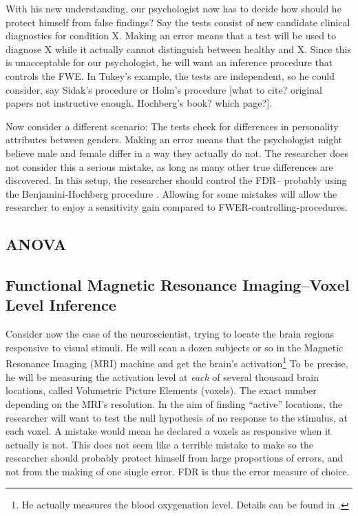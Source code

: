 \documentclass[draft,12pt]{article}
\begin{document}
With his new understanding, our psychologist now has to decide how should he protect himself from false findings? 
Say the tests consist of new candidate clinical diagnostics for condition X. Making an error means that a test will be used to diagnose X while it actually cannot distinguish between healthy and X. Since this is unacceptable for our psychologist, he will want an inference procedure that controls the FWE. In Tukey's example, the tests are independent, so he could consider, say Sidak's procedure or Holm's procedure [what to cite? original papers not instructive enough. Hochberg's book? which page?].


Now consider a different scenario: The tests check for differences in personality attributes between genders. Making an error means that the psychologist might believe male and female differ in a way they actually do not. The researcher does not consider this a serious mistake, as long as many other true differences are discovered. In this setup, the researcher should control the FDR-- probably using the Benjamini-Hochberg procedure \citep{benjamini_controlling_1995}. Allowing for some mistakes will allow the researcher to enjoy a sensitivity gain compared to FWER-controlling-procedures.


\subsection{ANOVA}



\subsection{\label{sub:fMRI}Functional Magnetic Resonance Imaging--Voxel Level Inference}
Consider now the case of the neuroscientist, trying to locate the brain regions responsive to visual stimuli. He will scan a dozen subjects or so in the Magnetic Resonance Imaging (MRI) machine and get the brain's activation\footnote{ He actually measures the blood oxygenation level. Details can be found in \cite{lazar_statistical_2008}.} To be precise, he will be measuring the activation level at \emph{each} of several thousand brain locations, called Volumetric Picture Elements (voxels). The exact number depending on the MRI's resolution. 
In the aim of finding ``active'' locations, the researcher will want to test the null hypothesis of no response to the stimulus, at each voxel. A mistake would mean he declared a voxels as responsive when it actually is not. This does not seem like a terrible mistake to make so the researcher should probably protect himself from large proportions of errors, and not from the making of one single error. FDR is thus the error measure of choice.
\end{document}
